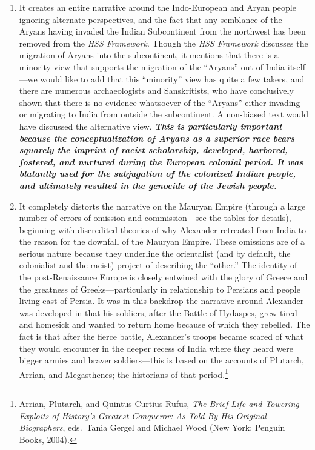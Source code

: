 \begin{enumerate} 
\item It creates an entire narrative around the Indo-European and Aryan people ignoring alternate perspectives, and the fact that any semblance of the Aryans having invaded the Indian Subcontinent from the northwest has been removed from the \textit{HSS Framework}. Though the \textit{HSS Framework} discusses the migration of Aryans into the subcontinent, it mentions that there is a minority view that supports the migration of the “Aryans” out of India itself—we would like to add that this “minority” view has quite a few takers, and there are numerous archaeologists and Sanskritists, who have conclusively shown that there is no evidence whatsoever of the “Aryans” either invading or migrating to India from outside the subcontinent. A non-biased text would have discussed the alternative view. \textit{\textbf{This is particularly important because the conceptualization of Aryans as a superior race bears squarely the imprint of racist scholarship, developed, harbored, fostered, and nurtured during the European colonial period. It was blatantly used for the subjugation of the colonized Indian people, and ultimately resulted in the genocide of the Jewish people.}} 

\item It completely distorts the narrative on the Mauryan Empire (through a large number of errors of omission and commission—see the tables for details), beginning with discredited theories of why Alexander retreated from India to the reason for the downfall of the Mauryan Empire. These omissions are of a serious nature because they underline the orientalist (and by default, the colonialist and the racist) project of describing the “other.” The identity of the post-Renaissance Europe is closely entwined with the glory of Greece and the greatness of Greeks—particularly in relationship to Persians and people living east of Persia. It was in this backdrop the narrative around Alexander was developed in that his soldiers, after the Battle of Hydaspes, grew tired and homesick and wanted to return home because of which they rebelled. The fact is that after the fierce battle, Alexander’s troops became scared of what they would encounter in the deeper recess of India where they heard were bigger armies and braver soldiers—this is based on the accounts of Plutarch, Arrian, and Megasthenes; the historians of that period.\footnote{Arrian, Plutarch, and Quintus Curtius Rufus, \textit{The Brief Life and Towering Exploits of History's Greatest Conqueror: As Told By His Original Biographers}, eds.\ Tania Gergel and Michael Wood (New York: Penguin Books, 2004).} 


\end{enumerate}
